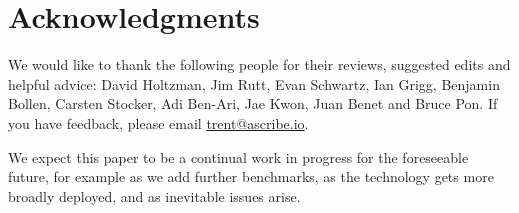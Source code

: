 \section{Acknowledgments}\label{sec:acknowledgments}

We would like to thank the following people for their reviews, suggested edits and helpful advice: David Holtzman, Jim Rutt, Evan Schwartz, Ian Grigg, Benjamin Bollen, Carsten Stocker, Adi Ben-Ari, Jae Kwon, Juan Benet and Bruce Pon. 
If you have feedback, please email \url{trent@ascribe.io}.

We expect this paper to be a continual work in progress for the foreseeable future, for example as we add further benchmarks, as the technology gets more broadly deployed, and as inevitable issues arise.